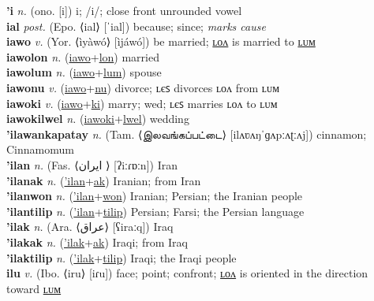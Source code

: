 \textbf{'i} \textit{n.} (ono. [i])
i; /i/; close front unrounded vowel \label{'i} \\
\textbf{ial} \textit{post.} (Epo. ⟨ial⟩ [ˈial])
because; since; \textit{marks cause} \label{ial} \\
\textbf{iawo} \textit{v.} (Yor. ⟨ìyàwó⟩ [ìjáwó])
be married; \hyperref[iawolon]{ʟᴏᴧ} is married to \hyperref[iawolum]{ʟᴜᴍ} \label{iawo} \\
\textbf{iawolon} \textit{n.} (\hyperref[iawo]{iawo}+\hyperref[lon]{lon})
married \label{iawolon} \\
\textbf{iawolum} \textit{n.} (\hyperref[iawo]{iawo}+\hyperref[lum]{lum})
spouse \label{iawolum} \\
\textbf{iawonu} \textit{v.} (\hyperref[iawo]{iawo}+\hyperref[nu]{nu})
divorce; ʟєꜱ divorces ʟᴏᴧ from ʟᴜᴍ \label{iawonu} \\
\textbf{iawoki} \textit{v.} (\hyperref[iawo]{iawo}+\hyperref[ki]{ki})
marry; wed; ʟєꜱ marries ʟᴏᴧ to ʟᴜᴍ \label{iawoki} \\
\textbf{iawokilwel} \textit{n.} (\hyperref[iawoki]{iawoki}+\hyperref[lwel]{lwel})
wedding \label{iawokilwel} \\
\textbf{'ilawankapatay} \textit{n.} (Tam. ⟨இலவங்கப்பட்டை⟩ [ilʌʋʌŋˈɡʌpːʌʈːʌj])
cinnamon; Cinnamomum \label{'ilawankapatay} \\
\textbf{'ilan} \textit{n.} (Fas. ⟨ایران‎ ⟩ [ʔiːɾɒːn])
Iran \label{'ilan} \\
\textbf{'ilanak} \textit{n.} (\hyperref['ilan]{'ilan}+\hyperref[ak]{ak})
Iranian; from Iran \label{'ilanak} \\
\textbf{'ilanwon} \textit{n.} (\hyperref['ilan]{'ilan}+\hyperref[won]{won})
Iranian; Persian; the Iranian people \label{'ilanwon} \\
\textbf{'ilantilip} \textit{n.} (\hyperref['ilan]{'ilan}+\hyperref[tilip]{tilip})
Persian; Farsi; the Persian language \label{'ilantilip} \\
\textbf{'ilak} \textit{n.} (Ara. ⟨عراق⟩ [ʕiraːq])
Iraq \label{'ilak} \\
\textbf{'ilakak} \textit{n.} (\hyperref['ilak]{'ilak}+\hyperref[ak]{ak})
Iraqi; from Iraq \label{'ilakak} \\
\textbf{'ilaktilip} \textit{n.} (\hyperref['ilak]{'ilak}+\hyperref[tilip]{tilip})
Iraqi; the Iraqi people \label{'ilaktilip} \\
\textbf{ilu} \textit{v.} (Ibo. ⟨iru⟩ [iɾu])
face; point; confront; \hyperref[ilulon]{ʟᴏᴧ} is oriented in the direction toward \hyperref[ilulum]{ʟᴜᴍ} \label{ilu} \\
